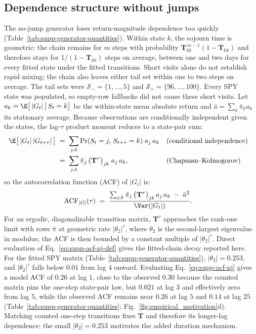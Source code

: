 \subsection{Dependence structure without jumps}
\label{sec:supp-gen-nojump}
\label{sec:supp-transitions}

The no-jump generator loses return-magnitude dependence too quickly (Table~\ref{tab:supp-generator-quantities}). Within state $k$, the sojourn time is geometric:
the chain remains for $m$ steps with probability
$\mathbf{T}_{kk}^{\,m-1} (1 - \mathbf{T}_{kk})$ and therefore stays
for $1/(1 - \mathbf{T}_{kk})$ steps on average, between one and two
days for every fitted state
under the fitted transitions. Short visits alone do not establish rapid mixing; the chain also leaves either tail set within one to two steps on average. The tail sets were $\mathcal{S}_{-}=\{1,\ldots,5\}$ and $\mathcal{S}_{+}=\{96,\ldots,100\}$. Every SPY state was populated, so empty-row fallbacks did not cause these short visits. Let $a_k =
\E\big[\,|G_t| \,\big|\, S_t = k\big]$ be the within-state mean
absolute return and $\bar a = \sum_k \bar\pi_k a_k$ its stationary
average. Because observations are conditionally independent given the
states, the lag-$\tau$ product moment reduces to a state-pair sum:
\begin{align}
  \E\big[\,|G_t|\, |G_{t+\tau}|\,\big]
   &\;=\; \sum_{j, k}
     \Pr(S_t = j,\, S_{t+\tau} = k)\; a_j\, a_k
     && \text{(conditional independence)} \notag \\
   &\;=\; \sum_{j, k} \bar\pi_j\,
     \big(\mathbf{T}^\tau\big)_{jk}\; a_j\, a_k,
     && \text{(Chapman--Kolmogorov)}
  \label{eq:supp-acf-nj}
\end{align}
so the autocorrelation function (ACF) of $|G_t|$ is:
\begin{equation}
  \mathrm{ACF}_{|G|}(\tau)
  \;=\; \frac{\sum_{j, k} \bar\pi_j\,
    \big(\mathbf{T}^\tau\big)_{jk}\, a_j\, a_k \;-\; \bar a^2}
    {\Var(|G_t|)}.
  \label{eq:supp-acf-nj-def}
\end{equation}
For an ergodic, diagonalizable transition matrix, $\mathbf{T}^\tau$ approaches the rank-one limit with rows $\bar\pi$ at geometric rate $|\theta_2|^\tau$, where $\theta_2$ is the second-largest eigenvalue in modulus; the ACF is then bounded by a constant multiple of $|\theta_2|^\tau$. Direct evaluation of Eq.~\eqref{eq:supp-acf-nj-def} gives the fitted-chain decay reported here. For the fitted SPY
matrix (Table~\ref{tab:supp-generator-quantities}), $|\theta_2| = 0.253$, and $|\theta_2|^\tau$ falls below
$0.01$ from lag $4$ onward. Evaluating Eq.~\eqref{eq:supp-acf-nj}
gives a model ACF of $0.26$ at lag $1$, close to the observed $0.30$
because the counted matrix pins the one-step state-pair law, but
$0.021$ at lag $3$ and effectively zero from lag $5$, while the
observed ACF remains near $0.26$ at lag $5$ and $0.14$ at lag $25$
(Table~\ref{tab:supp-generator-quantities};
Fig.~\ref{fig:empirical_motivation}d). Matching counted one-step transitions fixes $\mathbf{T}$ and therefore its longer-lag dependence; the small $|\theta_2| = 0.253$ motivates the added duration mechanism.

